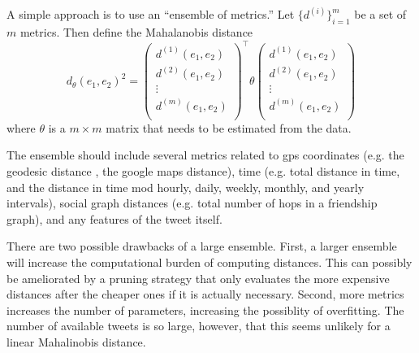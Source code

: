 \documentclass{article}
\newcommand{\R}{\mathbb{R}}
\newcommand{\trans}[1]{{#1}^{\top}}
\newcommand{\dist}{d}
\begin{document}
{\begin{enumerate}
        A simple approach is to use an ``ensemble of metrics.''
        Let $\{d^{(i)}\}_{i=1}^m$ be a set of $m$ metrics.
        Then define the Mahalanobis distance
        \begin{equation}
            \label{eq:mahalanobis}
            \dist_\theta(e_1,e_2) ^2
            =
            \trans{
            \begin{pmatrix}
                \dist^{(1)}(e_1,e_2) \\
                \dist^{(2)}(e_1,e_2) \\
                \vdots \\
                \dist^{(m)}(e_1,e_2) \\
            \end{pmatrix}
            }
            \theta
            \begin{pmatrix}
                \dist^{(1)}(e_1,e_2) \\
                \dist^{(2)}(e_1,e_2) \\
                \vdots \\
                \dist^{(m)}(e_1,e_2) \\
            \end{pmatrix}
        \end{equation}
        where $\theta$ is a $m\times m$ matrix that needs to be estimated from the data.

        The ensemble should include several metrics related to gps coordinates 
        (e.g. the geodesic distance \citep{vincenty1975direct}, the google maps distance),
        time 
        (e.g. total distance in time, and the distance in time mod hourly, daily, weekly, monthly, and yearly intervals),
        social graph distances
        (e.g. total number of hops in a friendship graph),
        and any features of the tweet itself.

        There are two possible drawbacks of a large ensemble.
        First, a larger ensemble will increase the computational burden of computing distances.
        This can possibly be ameliorated by a pruning strategy that only evaluates the more expensive distances after the cheaper ones if it is actually necessary.
        Second, more metrics increases the number of parameters, increasing the possiblity of overfitting.
        The number of available tweets is so large, however, that this seems unlikely for a linear Mahalinobis distance.


\end{enumerate}}
\end{document}
